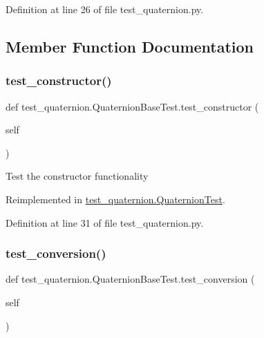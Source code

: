 Definition at line 26 of file test\+\_\+quaternion.\+py.



\subsection{Member Function Documentation}
\mbox{\label{classtest__quaternion_1_1QuaternionBaseTest_ada2ac60d65452ed38427e5eb13e4b7f8}} 
\subsubsection{\texorpdfstring{test\_constructor()}{test\_constructor()}}
{\footnotesize\ttfamily def test\+\_\+quaternion.\+Quaternion\+Base\+Test.\+test\+\_\+constructor (\begin{DoxyParamCaption}\item[{}]{self }\end{DoxyParamCaption})}

\begin{DoxyVerb}Test the constructor functionality\end{DoxyVerb}
 

Reimplemented in \mbox{\hyperlink{classtest__quaternion_1_1QuaternionTest_af2b57e92282ce65afff7c526d4c619ca}{test\+\_\+quaternion.\+Quaternion\+Test}}.



Definition at line 31 of file test\+\_\+quaternion.\+py.

\mbox{\label{classtest__quaternion_1_1QuaternionBaseTest_aefec8631d39a6ad0e62bf416e9806c20}} 
\subsubsection{\texorpdfstring{test\_conversion()}{test\_conversion()}}
{\footnotesize\ttfamily def test\+\_\+quaternion.\+Quaternion\+Base\+Test.\+test\+\_\+conversion (\begin{DoxyParamCaption}\item[{}]{self }\end{DoxyParamCaption})}

